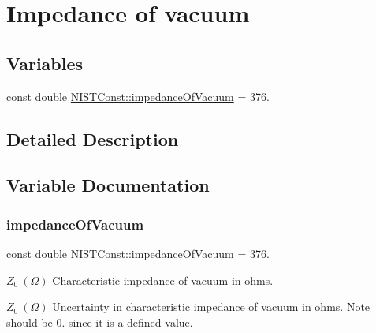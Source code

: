 \hypertarget{group___impedance_of_vacuum}{}\section{Impedance of vacuum}
\label{group___impedance_of_vacuum}
\subsection*{Variables}
\begin{DoxyCompactItemize}
\item 
const double \hyperlink{group___impedance_of_vacuum_ga51e1aede5d89041ea7423522b526dd0e}{N\+I\+S\+T\+Const\+::impedance\+Of\+Vacuum} = 376.
\end{DoxyCompactItemize}


\subsection{Detailed Description}


\subsection{Variable Documentation}
\mbox{\label{group___impedance_of_vacuum_ga51e1aede5d89041ea7423522b526dd0e}} 
\subsubsection{\texorpdfstring{impedance\+Of\+Vacuum}{impedanceOfVacuum}}
{\footnotesize\ttfamily const double N\+I\+S\+T\+Const\+::impedance\+Of\+Vacuum = 376.}

$Z_0 \ (\Omega)$ Characteristic impedance of vacuum in ohms.

$Z_0 \ (\Omega)$ Uncertainty in characteristic impedance of vacuum in ohms. Note should be 0. since it is a defined value. 